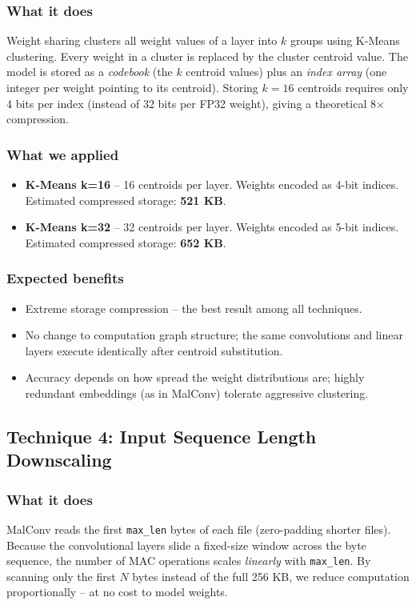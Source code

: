 \documentclass[12pt,a4paper]{article}
\begin{document}
\subsubsection{What it does}
Weight sharing clusters all weight values of a layer into $k$ groups using
K-Means clustering.  Every weight in a cluster is replaced by the cluster
centroid value.  The model is stored as a \textit{codebook} (the $k$ centroid
values) plus an \textit{index array} (one integer per weight pointing to its
centroid).  Storing $k{=}16$ centroids requires only 4 bits per index (instead
of 32 bits per FP32 weight), giving a theoretical 8$\times$ compression.

\subsubsection{What we applied}
\begin{itemize}
  \item \textbf{K-Means k=16} -- 16 centroids per layer.  Weights encoded as
        4-bit indices.  Estimated compressed storage: \textbf{521 KB}.
  \item \textbf{K-Means k=32} -- 32 centroids per layer.  Weights encoded as
        5-bit indices.  Estimated compressed storage: \textbf{652 KB}.
\end{itemize}

\subsubsection{Expected benefits}
\begin{itemize}
  \item Extreme storage compression -- the best result among all techniques.
  \item No change to computation graph structure; the same convolutions and
        linear layers execute identically after centroid substitution.
  \item Accuracy depends on how spread the weight distributions are; highly
        redundant embeddings (as in MalConv) tolerate aggressive clustering.
\end{itemize}

\subsection{Technique 4: Input Sequence Length Downscaling}

\subsubsection{What it does}
MalConv reads the first \texttt{max\_len} bytes of each file (zero-padding
shorter files).  Because the convolutional layers slide a fixed-size window
across the byte sequence, the number of MAC operations scales \textit{linearly}
with \texttt{max\_len}.  By scanning only the first $N$ bytes instead of the
full 256 KB, we reduce computation proportionally -- at no cost to model
weights.
\end{document}
